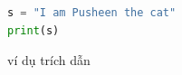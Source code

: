 \begin{lstlisting}[caption={Đoạn code}, label={lst:vdcode}, language=python]
s = "I am Pusheen the cat"
print(s)
\end{lstlisting}

ví dụ trích dẫn \cite{robinson2013graph}















